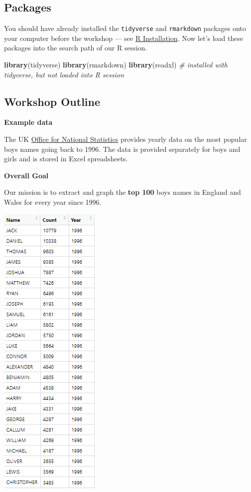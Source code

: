 \documentclass[]{book}
\newenvironment{Shaded}{\begin{snugshade}}{\end{snugshade}}
\newcommand{\KeywordTok}[1]{\textcolor[rgb]{0.13,0.29,0.53}{\textbf{#1}}}
\newcommand{\CommentTok}[1]{\textcolor[rgb]{0.56,0.35,0.01}{\textit{#1}}}
\newcommand{\NormalTok}[1]{#1}
\begin{document}
\subsection{Packages}\label{packages-2}

You should have already installed the \texttt{tidyverse} and
\texttt{rmarkdown} packages onto your computer before the workshop ---
see \href{./Rinstall.html}{R Installation}. Now let's load these
packages into the search path of our R session.

\begin{Shaded}
\begin{Highlighting}[]
\KeywordTok{library}\NormalTok{(tidyverse)}
\KeywordTok{library}\NormalTok{(rmarkdown)}
\KeywordTok{library}\NormalTok{(readxl) }\CommentTok{# installed with tidyverse, but not loaded into R session}
\end{Highlighting}
\end{Shaded}

\subsection{Workshop Outline}\label{workshop-outline-1}

\textbf{Example data}

The UK \href{https://www.ons.gov.uk}{Office for National Statistics}
provides yearly data on the most popular boys names going back to 1996.
The data is provided separately for boys and girls and is stored in
Excel spreadsheets.

\textbf{Overall Goal}

Our mission is to extract and graph the \textbf{top 100} boys names in
England and Wales for every year since 1996.

\includegraphics{R/RDataWrangling/images/goal.png}
\end{document}
